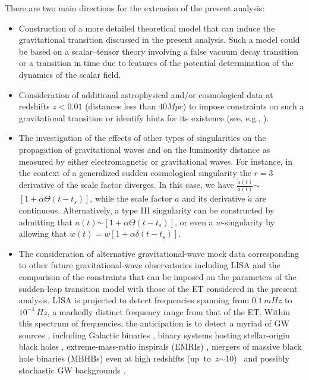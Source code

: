 \documentclass[universe,article,accept,moreauthors,pdftex]{Definitions/mdpi}
\begin{document}
There are two main directions for the extension of the present analysis:
\begin{itemize}
\item 
Construction of a more detailed theoretical model that can induce the gravitational transition discussed in the present analysis. Such a model could be based on a scalar--tensor theory involving a false vacuum decay transition or a transition in time due to features of the potential determination of the dynamics of the scalar field.%
\item 
Consideration of additional astrophysical and/or cosmological data at redshifts \mbox{$z<0.01$} (distances less than $40Mpc$) to impose constraints on such a gravitational transition or identify hints for its existence (see, e.g., \cite{Alestas:2021nmi}).
\item 
The investigation of the effects of other types of singularities on the propagation of gravitational waves and on the luminosity distance as measured by either electromagnetic or gravitational waves. For instance, in the context of a generalized sudden cosmological singularity the $r=3$ derivative of the scale factor diverges. In this case, we have $\frac{\ddot{a}(t)}{a(t)}$$\sim$$[1+\alpha\Theta(t-t_{s})]$, while the scale factor $a$ and its derivative $\dot{a}$ are continuous. Alternatively, a type III singularity can be constructed by admitting that $a(t)$$\sim$$[1+\alpha \Theta(t-t_{s})]$, or even a $w$-singularity by allowing that \mbox{$w(t)=w[1+\alpha \delta(t-t_s)]$.}
\item 
The consideration of alternative gravitational-wave mock data corresponding to other future gravitational-wave observatories including LISA \cite{LISA:2017pwj,Caprini:2015zlo} and the comparison of the constraints that can be imposed on the parameters of the sudden-leap transition model with those of the ET considered in the present analysis. LISA is projected to detect frequencies spanning from $0.1\,mHz$ to $10^{-1}\,Hz$, a markedly distinct frequency range from that of the ET. Within this spectrum of frequencies, the anticipation is to detect a myriad of GW sources \cite{article004}, including Galactic binaries \cite{Breivik:2017jip,article005,article006,Lau:2019wzw}, binary systems hosting stellar-origin black holes \cite{Sesana:2016ljz}, extreme-mass-ratio inspirals (EMRIs) \cite{Babak:2017tow}, mergers of massive black hole binaries (MBHBs) even at high redshifts \mbox{(up to $z$$\sim$$10$) \cite{Mangiagli:2022niy}} and possibly stochastic GW backgrounds \cite{Caprini:2018mtu}.
\end{itemize}
\end{document}
